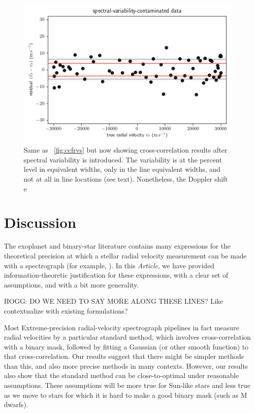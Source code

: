 \documentclass[modern]{aastex631}
\newcommand{\documentname}{\textsl{Article}}
\newcommand{\figref}[1]{\figurename~\ref{#1}}
\begin{document}
\begin{figure}[tp]
  \begin{mdframed}
    \begin{center}
    \includegraphics[width=\textwidth]{../notebook/variable.png}
    \end{center}
    \caption{Same as \figref{fig:ccfrvs} but now showing cross-correlation results after spectral variability is introduced. The variability is at the percent level in equivalent widths, only in the line equivalent widths, and not at all in line locations (see text). Nonetheless, the Doppler shift e\label{fig:variable}}
  \end{mdframed}
\end{figure}

\section{Discussion}\label{sec:discussion}

The exoplanet and binary-star literature contains many expressions for the theoretical precision at which a stellar radial velocity measurement can be made with a spectrograph (for example, \citealt{whatever}).
In this \documentname, we have provided information-theoretic justification for these expressions, with a clear set of assumptions, and with a bit more generality.

HOGG: DO WE NEED TO SAY MORE ALONG THESE LINES? Like contextualize with existing formulations?

Most Extreme-precision radial-velocity spectrograph pipelines in fact measure radial velocities by a particular standard method, which involves cross-correlation with a binary mask, followed by fitting a Gaussian (or other smooth function) to that cross-correlation.
Our results suggest that there might be simpler methods than this, and also more precise methods in many contexts.
However, our results also show that the standard method can be close-to-optimal under reasonable assumptions.
These assumptions will be more true for Sun-like stars and less true as we move to stars for which it is hard to make a good binary mask (such as M dwarfs).
\end{document}
